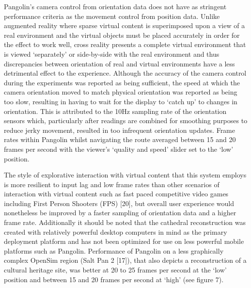 Pangolin's camera control from orientation data does not have as stringent performance criteria as the movement control from position data. Unlike augmented reality where sparse virtual content is superimposed upon a view of a real environment and the virtual objects must be placed accurately in order for the effect to work well, cross reality presents a complete virtual environment that is viewed `separately' or side-by-side with the real environment and thus discrepancies between orientation of real and virtual environments have a less detrimental effect to the experience. Although the accuracy of the camera control during the experiments was reported as being sufficient, the speed at which the camera orientation moved to match physical orientation was reported as being too slow, resulting in having to wait for the display to `catch up' to changes in orientation. This is attributed to the 10Hz sampling rate of the orientation sensors which, particularly after readings are combined for smoothing purposes to reduce jerky movement, resulted in too infrequent orientation updates. Frame rates within Pangolin whilst navigating the route averaged between 15 and 20 frames per second with the viewer's `quality and speed' slider set to the `low' position.

The style of explorative interaction with virtual content that this system employs is more resilient to input lag and low frame rates than other scenarios of interaction with virtual content such as fast paced competitive video games including First Person Shooters (FPS) [20], but overall user experience would nonetheless be improved by a faster sampling of orientation data and a higher frame rate. Additionally it should be noted that the cathedral reconstruction was created with relatively powerful desktop computers in mind as the primary deployment platform and has not been optimized for use on less powerful mobile platforms such as Pangolin. Performance of Pangolin on a less graphically complex OpenSim region (Salt Pan 2 [17]), that also depicts a reconstruction of a cultural heritage site, was better at 20 to 25 frames per second at the `low' position and between 15 and 20 frames per second at `high' (see figure 7).


